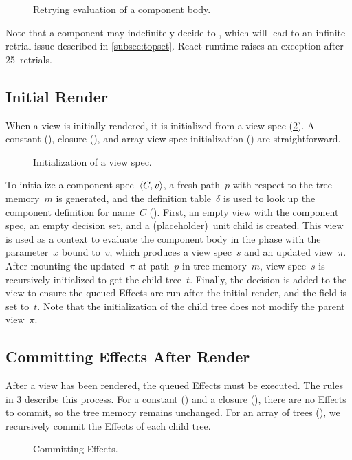 \begin{figure}[t]
  \centering
  
  \caption{Retrying evaluation of a component body.}\label{fig:evalmult}
\end{figure}

Note that a component may indefinitely decide to , which will lead to an infinite retrial issue described in \cref{subsec:topset}.
React runtime raises an exception after 25~retrials.


\subsection{Initial Render}\label{subsec:body}
When a view is initially rendered, it is initialized from a view spec (\cref{fig:init}).
A constant (), closure (), and array view spec initialization () are straightforward.
\begin{figure}[t]
  \centering
  
  \caption{Initialization of a view spec.}\label{fig:init}
\end{figure}

To initialize a component spec~$\langle C, v\rangle$, a fresh path~$p$ with respect to the tree memory~$m$ is generated, and the definition table~$\delta$ is used to look up the component definition for name~$C$ ().
First, an empty view with the component spec, an empty decision set, and a (placeholder)~unit child is created.
This view is used as a context to evaluate the component body in the  phase with the parameter~$x$ bound to~$v$, which produces a view spec~$s$ and an updated view~$\pi$.
After mounting the updated~$\pi$ at path~$p$ in tree memory~$m$, view spec~$s$ is recursively initialized to get the child tree~$t$.
Finally, the  decision is added to the view to ensure the queued Effects are run after the initial render, and the  field is set to~$t$.
Note that the initialization of the child tree does not modify the parent view~$\pi$.

\subsection{Committing Effects After Render}\label{subsec:commiteffs}
After a view has been rendered, the queued Effects must be executed.
The rules in \cref{fig:commiteffs} describe this process.
For a constant () and a closure (), there are no Effects to commit, so the tree memory remains unchanged.
For an array of trees (), we recursively commit the Effects of each child tree.
\begin{figure}[t]
  \centering
  
  \caption{Committing Effects.}\label{fig:commiteffs}
\end{figure}

